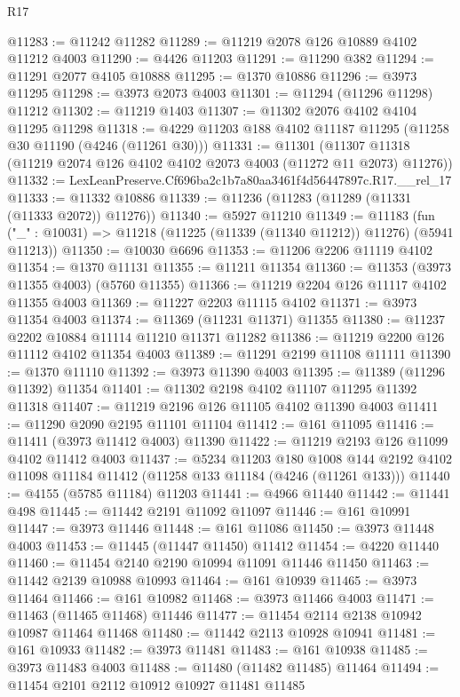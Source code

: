 \begin{lexlean}{R17}
\begin{coremodule}
@11283 := @11242 @11282
@11289 := @11219 @2078 @126 @10889 @4102 @11212 @4003
@11290 := @4426 @11203
@11291 := @11290 @382
@11294 := @11291 @2077 @4105 @10888
@11295 := @1370 @10886
@11296 := @3973 @11295
@11298 := @3973 @2073 @4003
@11301 := @11294 (@11296 @11298) @11212
@11302 := @11219 @1403
@11307 := @11302 @2076 @4102 @4104 @11295 @11298
@11318 := @4229 @11203 @188 @4102 @11187 @11295 (@11258 @30 @11190 (@4246 (@11261 @30)))
@11331 := @11301
    (@11307 @11318 (@11219 @2074 @126 @4102 @4102 @2073 @4003 (@11272 @11 @2073) @11276))
@11332 := LexLeanPreserve.Cf696ba2c1b7a80aa3461f4d56447897c.R17.__rel_17
@11333 := @11332 @10886
@11339 := @11236 (@11283 (@11289 (@11331 (@11333 @2072)) @11276))
@11340 := @5927 @11210
@11349 := @11183
    (fun ("_" : @10031) => @11218 (@11225 (@11339 (@11340 @11212)) @11276) (@5941 @11213))
@11350 := @10030 @6696
@11353 := @11206 @2206 @11119 @4102
@11354 := @1370 @11131
@11355 := @11211 @11354
@11360 := @11353 (@3973 @11355 @4003) (@5760 @11355)
@11366 := @11219 @2204 @126 @11117 @4102 @11355 @4003
@11369 := @11227 @2203 @11115 @4102
@11371 := @3973 @11354 @4003
@11374 := @11369 (@11231 @11371) @11355
@11380 := @11237 @2202 @10884 @11114 @11210 @11371 @11282
@11386 := @11219 @2200 @126 @11112 @4102 @11354 @4003
@11389 := @11291 @2199 @11108 @11111
@11390 := @1370 @11110
@11392 := @3973 @11390 @4003
@11395 := @11389 (@11296 @11392) @11354
@11401 := @11302 @2198 @4102 @11107 @11295 @11392 @11318
@11407 := @11219 @2196 @126 @11105 @4102 @11390 @4003
@11411 := @11290 @2090 @2195 @11101 @11104
@11412 := @161 @11095
@11416 := @11411 (@3973 @11412 @4003) @11390
@11422 := @11219 @2193 @126 @11099 @4102 @11412 @4003
@11437 := @5234
    @11203
    @180
    @1008
    @144
    @2192
    @4102
    @11098
    @11184
    @11412
    (@11258 @133 @11184 (@4246 (@11261 @133)))
@11440 := @4155 (@5785 @11184) @11203
@11441 := @4966 @11440
@11442 := @11441 @498
@11445 := @11442 @2191 @11092 @11097
@11446 := @161 @10991
@11447 := @3973 @11446
@11448 := @161 @11086
@11450 := @3973 @11448 @4003
@11453 := @11445 (@11447 @11450) @11412
@11454 := @4220 @11440
@11460 := @11454 @2140 @2190 @10994 @11091 @11446 @11450
@11463 := @11442 @2139 @10988 @10993
@11464 := @161 @10939
@11465 := @3973 @11464
@11466 := @161 @10982
@11468 := @3973 @11466 @4003
@11471 := @11463 (@11465 @11468) @11446
@11477 := @11454 @2114 @2138 @10942 @10987 @11464 @11468
@11480 := @11442 @2113 @10928 @10941
@11481 := @161 @10933
@11482 := @3973 @11481
@11483 := @161 @10938
@11485 := @3973 @11483 @4003
@11488 := @11480 (@11482 @11485) @11464
@11494 := @11454 @2101 @2112 @10912 @10927 @11481 @11485

\end{coremodule}
\end{lexlean}
